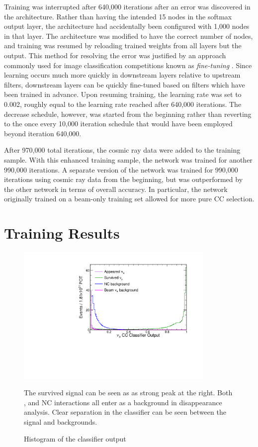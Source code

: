 Training was interrupted after 640,000 iterations after an error
was discovered in the architecture.
Rather than having the intended 15 nodes in the softmax output layer,
the architecture had accidentally been configured with 1,000 nodes in that
layer.
The architecture was modified to have the correct number of nodes, and training
was resumed by reloading trained weights from all layers but the output.
This method for resolving the error was justified by an approach
commonly used for image classification competitions known as
\textit{fine-tuning} \cite{krizhevsky2012imagenet}.
Since learning occurs much more quickly in downstream layers relative to
upstream filters, downstream layers can be quickly fine-tuned based on
filters which have been trained in advance.
Upon resuming training, the learning rate was set to 0.002, roughly equal to
the learning rate reached after 640,000 iterations.
The decrease schedule, however, was started from the beginning rather
than reverting to the once every 10,000 iteration schedule
that would have been employed beyond iteration 640,000.

After 970,000 total iterations, the cosmic ray data were added to the
training sample.
With this enhanced training sample, the network was trained for another
990,000 iterations.
A separate version of the network was trained for 990,000 iterations
using cosmic ray data from the beginning, but was outperformed by the
other network in terms of overall accuracy.
In particular, the network originally trained on a beam-only training set
allowed for more pure \nue CC selection.


\section{Training Results}

\begin{figure}
\begin{center}
\includegraphics[width=0.85\textwidth]{figures/cnn/numu_pid_dist.pdf}
\end{center}
\caption{Histogram of the \nue classifier output}{
The survived \numu signal can be seen as as strong peak at the right.
Both \nue, and NC interactions all enter as a background
in \numu disappearance analysis.
Clear separation in the classifier can be seen between the signal and backgrounds.
}
\label{numupid}
\end{figure}


